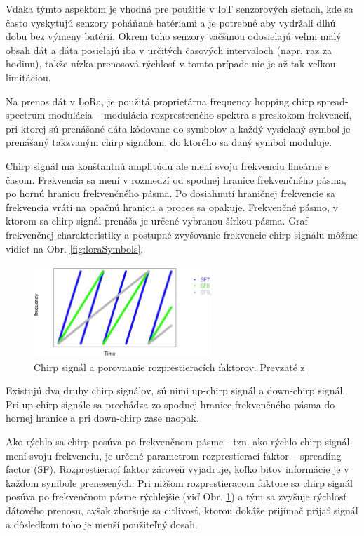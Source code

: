 \documentclass[slovak,master]{diploma}
\begin{document}
Vďaka týmto aspektom je vhodná pre použitie v IoT senzorových sieťach, kde sa často vyskytujú senzory poháňané batériami a je potrebné aby vydržali dlhú dobu 
bez výmeny batérií. Okrem toho senzory väčšinou odosielajú veľmi malý obsah dát a dáta posielajú iba v určitých časových intervaloch (napr. raz za hodinu), 
takže nízka prenosová rýchlosť v tomto prípade nie je až tak veľkou limitáciou.

Na prenos dát v LoRa, je použitá proprietárna frequency hopping chirp spread-spectrum modulácia -- modulácia rozprestreného spektra s preskokom frekvencií, pri ktorej sú prenášané dáta kódovane do symbolov 
a každý vysielaný symbol je prenášaný takzvaným chirp signálom, do ktorého sa daný symbol moduluje.

Chirp signál ma konštantnú amplitúdu ale mení svoju frekvenciu lineárne s časom. 
Frekvencia sa mení v rozmedzí od spodnej hranice frekvenčného pásma, po hornú hranicu frekvenčného pásma.
Po dosiahnutí hraničnej frekvencie sa frekvencia vráti na opačnú hranicu a proces sa opakuje.
Frekvenčné pásmo, v ktorom sa chirp signál prenáša je určené vybranou šírkou pásma.
Graf frekvenčnej charakteristiky a postupné zvyšovanie frekvencie chirp signálu môžme vidieť na Obr. \ref{fig:loraSymbols}.
\begin{figure}
	\centering
	\includegraphics[width=0.6\textwidth]{Figures/spreading factors.png}
	\caption{Chirp signál a porovnanie rozprestieracích faktorov. Prevzaté z \cite{spreadfactorimage}}
	\label{fig:spreadingfactors}
\end{figure}

Existujú dva druhy chirp signálov, sú nimi up-chirp signál a down-chirp signál. Pri up-chirp signále sa prechádza zo spodnej hranice frekvenčného pásma do hornej hranice a pri 
down-chirp zase naopak.

\newpage
Ako rýchlo sa chirp posúva po frekvenčnom pásme - tzn. ako rýchlo chirp signál mení svoju frekvenciu, je určené parametrom rozprestierací faktor -- spreading factor (SF). 
Rozprestierací faktor zároveň vyjadruje, koľko bitov informácie je v každom symbole prenesených. Pri nižšom rozprestieracom faktore sa chirp signál posúva po 
frekvenčnom pásme rýchlejšie (viď Obr. \ref{fig:spreadingfactors}) a tým sa zvyšuje rýchlosť dátového prenosu, 
avšak zhoršuje sa citlivosť, ktorou dokáže prijímač prijať signál a dôsledkom toho je menší použiteľný dosah.
\end{document}
